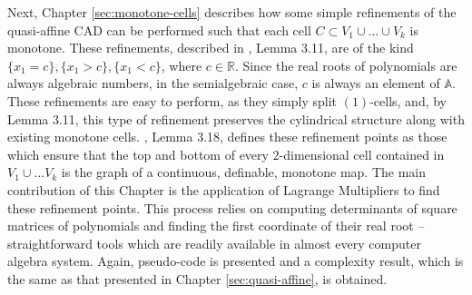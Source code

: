 \documentclass[
]{book}
\theoremstyle{definition}
\theoremstyle{definition}
\theoremstyle{definition}
\theoremstyle{definition}
\theoremstyle{remark}
\begin{document}
Next, Chapter \ref{sec:monotone-cells} describes how some simple refinements of the quasi-affine CAD can be performed such that each cell \(C \subset V_1 \cup \ldots \cup V_k\) is monotone. These refinements, described in \citet{bgv15}, Lemma 3.11, are of the kind \(\{ x_1 = c \}, \{ x_1 > c \}, \{ x_1 < c \}\), where \(c \in \mathbb{R}\). Since the real roots of polynomials are always algebraic numbers, in the semialgebraic case, \(c\) is always an element of \(\mathbb{A}\). These refinements are easy to perform, as they simply split \((1)\)-cells, and, by \citet{bgv15} Lemma 3.11, this type of refinement preserves the cylindrical structure along with existing monotone cells.
\citet{bgv15}, Lemma 3.18, defines these refinement points as those which ensure that the top and bottom of every \(2\)-dimensional cell contained in \(V_1\cup \ldots V_k\) is the graph of a continuous, definable, monotone map. The main contribution of this Chapter is the application of Lagrange Multipliers to find these refinement points. This process relies on computing determinants of square matrices of polynomials and finding the first coordinate of their real root -- straightforward tools which are readily available in almost every computer algebra system.
Again, pseudo-code is presented and a complexity result, which is the same as that presented in Chapter \ref{sec:quasi-affine}, is obtained.
\end{document}
